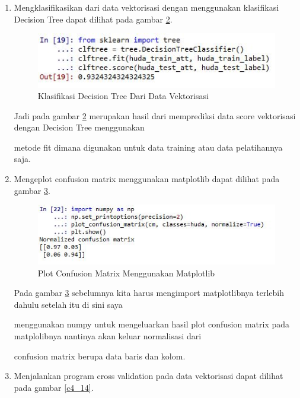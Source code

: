 \begin{enumerate}
\begin{figure}[ht]
	\caption{Klasifikasi SVM Dari Data Vektorisasi}
	\label{c4_11}
\end{figure}
\subitem Jadi pada gambar \ref{c4_11} merupakan hasil dari memprediksi data score vektorisasi dengan svm menggunakan metode \par fit dimana digunakan untuk data training atau data pelatihannya saja.
\item Mengklasifikasikan dari data vektorisasi dengan menggunakan klasifikasi Decision Tree dapat dilihat pada gambar \ref{c4_12}.
\begin{figure}[ht]
	\centerline{\includegraphics[width=1\textwidth]{figures/huda/chapter4/12.JPG}}
	\caption{Klasifikasi Decision Tree Dari Data Vektorisasi}
	\label{c4_12}
\end{figure}
\subitem Jadi pada gambar \ref{c4_12} merupakan hasil dari memprediksi data score vektorisasi dengan Decision Tree menggunakan \par metode fit dimana digunakan untuk data training atau data pelatihannya saja.
\item Mengeplot confusion matrix menggunakan matplotlib dapat dilihat pada gambar \ref{c4_13}.
\begin{figure}[ht]
	\centerline{\includegraphics[width=1\textwidth]{figures/huda/chapter4/13.JPG}}
	\caption{Plot Confusion Matrix Menggunakan Matplotlib}
	\label{c4_13}
\end{figure}
\subitem Pada gambar \ref{c4_13} sebelumnya kita harus mengimport matplotlibnya terlebih dahulu setelah itu di sini saya 
\par menggunakan numpy untuk mengeluarkan hasil plot confusion matrix pada matplolibnya nantinya akan keluar normalisasi dari \par confusion matrix berupa data baris dan kolom. 
\item Menjalankan program cross validation pada data vektorisasi dapat dilihat pada gambar \ref{c4_14}.

\end{enumerate}
